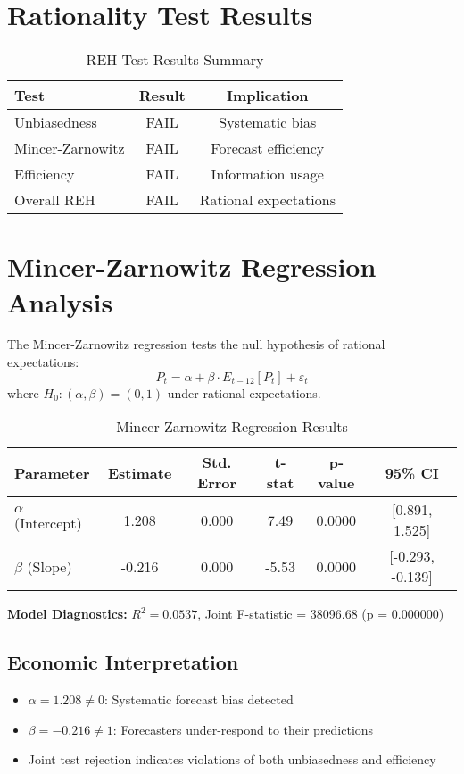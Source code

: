 \documentclass[11pt,a4paper]{article}
\begin{document}
\section{Rationality Test Results}

\begin{table}[H]
\centering
\caption{REH Test Results Summary}
\begin{tabular}{lcc}
\toprule
\textbf{Test} & \textbf{Result} & \textbf{Implication} \\
\midrule
Unbiasedness & \textcolor{academicred}{FAIL} & Systematic bias \\
Mincer-Zarnowitz & \textcolor{academicred}{FAIL} & Forecast efficiency \\
Efficiency & \textcolor{academicred}{FAIL} & Information usage \\
Overall REH & \textcolor{academicred}{FAIL} & Rational expectations \\
\bottomrule
\end{tabular}
\end{table}

\section{Mincer-Zarnowitz Regression Analysis}

The Mincer-Zarnowitz regression tests the null hypothesis of rational expectations:
\begin{equation}
P_t = \alpha + \beta \cdot E_{t-12}[P_t] + \varepsilon_t
\end{equation}
where $H_0: (\alpha, \beta) = (0, 1)$ under rational expectations.

\begin{table}[H]
\centering
\caption{Mincer-Zarnowitz Regression Results}
\begin{tabular}{lccccc}
\toprule
\textbf{Parameter} & \textbf{Estimate} & \textbf{Std. Error} & \textbf{t-stat} & \textbf{p-value} & \textbf{95\% CI} \\
\midrule
$\alpha$ (Intercept) & 1.208 & 0.000 & 7.49 & 0.0000 & [0.891, 1.525] \\
$\beta$ (Slope) & -0.216 & 0.000 & -5.53 & 0.0000 & [-0.293, -0.139] \\
\bottomrule
\end{tabular}
\end{table}

\textbf{Model Diagnostics:} $R^2 = 0.0537$, Joint F-statistic = 38096.68 (p = 0.000000)

\subsection{Economic Interpretation}
\begin{itemize}
\item $\alpha = 1.208 \neq 0$: Systematic forecast bias detected
\item $\beta = -0.216 \neq 1$: Forecasters under-respond to their predictions
\item Joint test rejection indicates violations of both unbiasedness and efficiency
\end{itemize}
\end{document}
